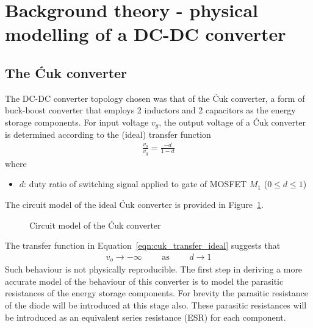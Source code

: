 \section{Background theory - physical modelling of a DC-DC converter}
\subsection{The \'{C}uk converter}
The DC-DC converter topology chosen was that of the \'{C}uk converter, a form of buck-boost converter that employs 2 inductors and 2 capacitors as the energy storage components.
\newpar
For input voltage $v_g$, the output voltage of a \'{C}uk converter is determined according to the (ideal) transfer function
\begin{align}\label{eqn:cuk_transfer_ideal}
\frac{v_o}{v_g} = \frac{\minus d}{1 - d}
\end{align}
where
\begin{itemize}
\item $d$: duty ratio of switching signal applied to gate of MOSFET $M_1$ ($0 \leq d \leq 1$)
\end{itemize}
The circuit model of the ideal \'{C}uk converter is provided in Figure~\ref{cir:cuk_ideal}.
\begin{figure}[H]
\centering
{}
\caption{Circuit model of the \'Cuk converter}
\label{cir:cuk_ideal}
\end{figure}
The transfer function in Equation~\ref{eqn:cuk_transfer_ideal} suggests that
\begin{align*}
v_o \rightarrow \minus\infty \qquad\text{ as }\qquad d \rightarrow 1
\end{align*}
Such behaviour is not physically reproducible. The first step in deriving a more accurate model of the behaviour of this converter is to model the parasitic resistances of the energy storage components. For brevity the parasitic resistance of the diode will be introduced at this stage also. These parasitic resistances will be introduced as an equivalent series resistance (ESR) for each component.
